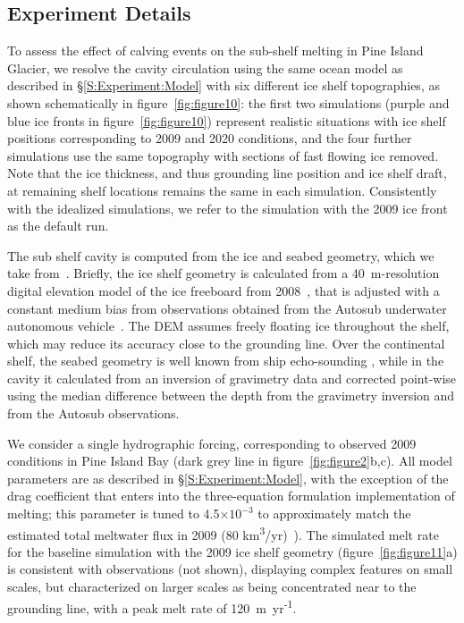 \documentclass[draft]{agujournal2019}
\begin{document}
\subsection{Experiment Details}
To assess the effect of calving events on the sub-shelf melting in Pine Island Glacier, we resolve the cavity circulation using the same ocean model as described in \S\ref{S:Experiment:Model} with six different ice shelf topographies, as shown schematically in figure~\ref{fig:figure10}: the first two simulations (purple and blue ice fronts in figure~\ref{fig:figure10}) represent realistic situations with ice shelf positions corresponding to 2009 and 2020 conditions, and the four further simulations use the same topography with sections of fast flowing ice removed. Note that the ice thickness, and thus grounding line position and ice shelf draft, at remaining shelf locations remains the same in each simulation. Consistently with the idealized simulations, we refer to the simulation with the 2009 ice front as the default run.

The sub shelf cavity is computed from the ice and seabed geometry, which we take from~. Briefly, the ice shelf geometry is calculated from a 40~m-resolution digital elevation model of the ice freeboard from 2008~\cite{Korona2009Photogrammetry}, that is adjusted with a constant medium bias from observations obtained from the Autosub underwater autonomous vehicle~\cite{Jenkins2010NatureGeo}. The DEM assumes freely floating ice throughout the shelf, which may reduce its accuracy close to the grounding line. Over the continental shelf, the seabed geometry is well known from ship echo-sounding \cite{Dutrieux2014Science}, while in the cavity it calculated from an inversion of gravimetry data and corrected point-wise using the median difference between the depth from the gravimetry inversion and from the Autosub observations. 

We consider a single hydrographic forcing, corresponding to observed 2009 conditions in Pine Island Bay (dark grey line in figure~\ref{fig:figure2}b,c). All model parameters are as described in \S\ref{S:Experiment:Model}, with the exception of the drag coefficient that enters into the three-equation formulation implementation of melting; this parameter is tuned to 4.5$\times10^{-3}$ to approximately match the estimated total meltwater flux in 2009 (80 km\textsuperscript{3}/yr)~\cite{Dutrieux2014Science}). The simulated melt rate for the baseline simulation with the 2009 ice shelf geometry (figure~\ref{fig:figure11}a) is consistent with observations (not shown), displaying complex features on small scales, but characterized on larger scales as being concentrated near to the grounding line, with a peak melt rate of 120~m~yr\textsuperscript{-1}.
\end{document}
